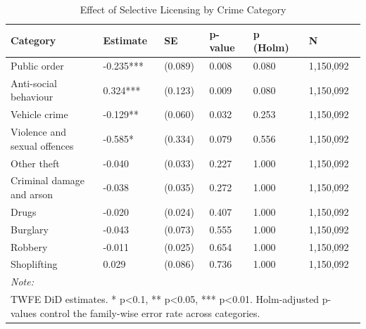 \begin{table}[!h]
\centering
\caption{\label{tab:categories}Effect of Selective Licensing by Crime Category}
\centering
\begin{tabular}[t]{llllll}
\toprule
Category & Estimate & SE & p-value & p (Holm) & N\\
\midrule
Public order & -0.235*** & (0.089) & 0.008 & 0.080 & 1,150,092\\
Anti-social behaviour & 0.324*** & (0.123) & 0.009 & 0.080 & 1,150,092\\
Vehicle crime & -0.129** & (0.060) & 0.032 & 0.253 & 1,150,092\\
Violence and sexual offences & -0.585* & (0.334) & 0.079 & 0.556 & 1,150,092\\
Other theft & -0.040 & (0.033) & 0.227 & 1.000 & 1,150,092\\
\addlinespace
Criminal damage and arson & -0.038 & (0.035) & 0.272 & 1.000 & 1,150,092\\
Drugs & -0.020 & (0.024) & 0.407 & 1.000 & 1,150,092\\
Burglary & -0.043 & (0.073) & 0.555 & 1.000 & 1,150,092\\
Robbery & -0.011 & (0.025) & 0.654 & 1.000 & 1,150,092\\
Shoplifting & 0.029 & (0.086) & 0.736 & 1.000 & 1,150,092\\
\bottomrule
\multicolumn{6}{l}{\rule{0pt}{1em}\textit{Note: }}\\
\multicolumn{6}{l}{\rule{0pt}{1em}TWFE DiD estimates. * p<0.1, ** p<0.05, *** p<0.01. Holm-adjusted p-values control the family-wise error rate across categories.}\\
\end{tabular}
\end{table}
